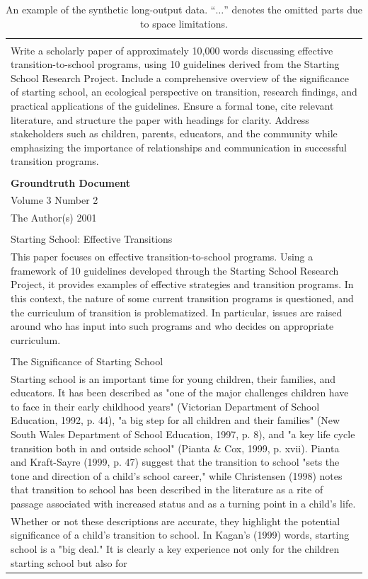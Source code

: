 \documentclass{article}
\begin{document}
\begin{table}[ht]
\centering
\caption{An example of the synthetic long-output data.
``$\ldots$'' denotes the omitted parts due to space limitations.}
\label{tab:app_long_output_example}
\small{\begin{tabular}{l}
\hline
\begin{tabular}[c]{@{}p{0.97\linewidth}@{}}\textbf{Synthetic Instruction}\\Write a scholarly paper of approximately 10,000 words discussing effective transition-to-school programs, using 10 guidelines derived from the Starting School Research Project. Include a comprehensive overview of the significance of starting school, an ecological perspective on transition, research findings, and practical applications of the guidelines. Ensure a formal tone, cite relevant literature, and structure the paper with headings for clarity. Address stakeholders such as children, parents, educators, and the community while emphasizing the importance of relationships and communication in successful transition programs.\\\\ \textbf{Groundtruth Document}\\Volume 3 Number 2\\The Author(s) 2001\\\\Starting School: Effective Transitions\\This paper focuses on effective transition-to-school programs. Using a framework of 10 guidelines developed through the Starting School Research Project, it provides examples of effective strategies and transition programs. In this context, the nature of some current transition programs is questioned, and the curriculum of transition is problematized. In particular, issues are raised around who has input into such programs and who decides on appropriate curriculum.\\\\The Significance of Starting School\\Starting school is an important time for young children, their families, and educators. It has been described as "one of the major challenges children have to face in their early childhood years" (Victorian Department of School Education, 1992, p. 44), "a big step for all children and their families" (New South Wales Department of School Education, 1997, p. 8), and "a key life cycle transition both in and outside school" (Pianta \& Cox, 1999, p. xvii). Pianta and Kraft-Sayre (1999, p. 47) suggest that the transition to school "sets the tone and direction of a child's school career," while Christensen (1998) notes that transition to school has been described in the literature as a rite of passage associated with increased status and as a turning point in a child's life.\\Whether or not these descriptions are accurate, they highlight the potential significance of a child's transition to school. In Kagan's (1999) words, starting school is a "big deal." It is clearly a key experience not only for the children starting school but also for 
\end{tabular}}
\end{table}
\end{document}
